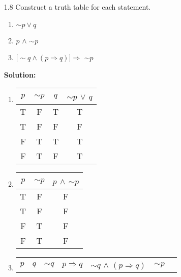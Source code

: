 \begin{enumerate}
   \item[1.8] Construct a truth table for each statement.
      \begin{enumerate}
         \item $\sim$$p \lor q$
         \item $p$ $\land$ $\sim$$p$
         \item $[\sim$$q \land (p \Rightarrow q)] \Rightarrow$ $\sim$$p$
      \end{enumerate}

      \textbf{Solution:}

      \begin{enumerate}
         \item \mbox{}
            \begin{center}
               \begin{tabular}{@{}|c|c|c|c|@{}} 
                  \hline $p$ & $\sim$$p$ & $q$ & $\sim$$p$ $\lor$ $q$\\ \hline
                  T & F & T & T\\
                  T & F & F & F\\
                  F & T & T & T\\
                  F & T & F & T\\ \hline
               \end{tabular}
            \end{center}
         \item \mbox{}
            \begin{center}
               \begin{tabular}{@{}|c|c|c|@{}} 
                  \hline $p$ & $\sim$$p$ & $p$ $\land$ $\sim$$p$\\ \hline
                  T & F & F\\
                  T & F & F\\
                  F & T & F\\
                  F & T & F\\ \hline
               \end{tabular}
            \end{center}
         \item \mbox{}
            \begin{center}
               \begin{tabular}{@{}|c|c|c|c|c|c|c|@{}} 
                  \hline $p$ & $q$ & $\sim$$q$ & $p \Rightarrow q$ &
                  $\sim$$q$ $\land$ $(p \Rightarrow q)$ & $\sim$$p$ &
$$
\end{tabular}
\end{center}
\end{enumerate}
\end{enumerate}
